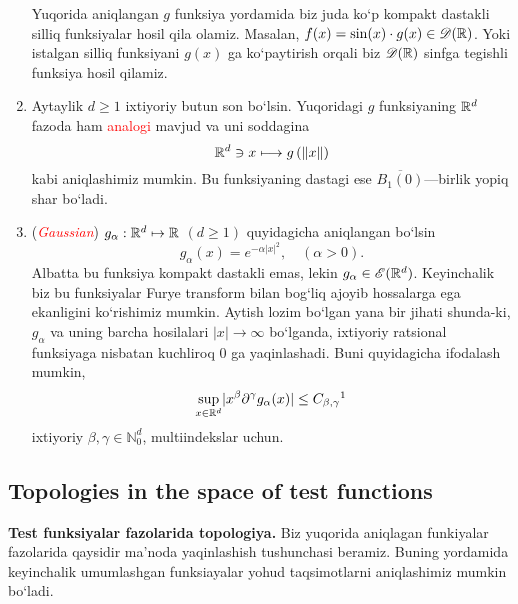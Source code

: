 \begin{example}
\begin{enumerate}
\begin{minipage}{0.9\textwidth}
\begin{minipage}[b]{0.45\textwidth}
\begin{figure}[H]
        \end{figure}
    \end{minipage}
    \end{minipage}
\break
Yuqorida aniqlangan $g$ funksiya yordamida biz juda ko`p kompakt dastakli sil\-liq funksiyalar hosil qila olamiz. Masalan, $f(x)=\sin(x)\cdot g(x)\in\mathscr{D}(\mathbb{R})$. Yoki istalgan silliq funksiyani $g(x)$ ga ko`paytirish orqali biz $\mathscr{D}(\mathbb{R})$ sinfga tegishli funksiya hosil qilamiz.

\item Aytaylik $d\ge 1$ ixtiyoriy butun son bo`lsin. Yuqoridagi $g$ funksiyaning ${\mathbb{R}^{d}}$ fazoda ham \textcolor{red}{analogi} mavjud va uni soddagina 
\begin{equation*}
    {\mathbb{R}^{d}} \ni x\longmapsto g\left(\lVert x\rVert\right)
\end{equation*}
kabi aniqlashimiz mumkin. Bu funksiyaning dastagi ese $\overline{B_1(0)}$---birlik yopiq shar bo`ladi.

\item (\emph{\textcolor{red}{Gaussian}}) $g_\alpha : {\mathbb{R}^{d}} \mapsto \mathbb{R}$ $(d\ge1)$ quyidagicha aniqlangan bo`lsin 
\begin{equation*}
    g_\alpha(x)=e^{-\alpha \lvert x\rvert^2}, \quad (\alpha>0).
\end{equation*}
Albatta bu funksiya kompakt dastakli emas, lekin $g_\alpha \in\mathscr{E}({\mathbb{R}^{d}})$. Keyinchalik biz bu funksiyalar Furye transform bilan bog`liq ajoyib hossalarga ega ekanligini ko`\-ri\-shi\-miz mumkin. Aytish lozim bo`lgan yana bir jihati shunda-ki, $g_\alpha$ va uning barcha hosilalari $\lvert x\rvert \to \infty$  bo`lganda, ixtiyoriy ratsional funksiyaga nisbatan kuchliroq $0$ ga yaqinlashadi. Buni quyidagicha ifodalash mumkin,
\begin{equation*}
    \sup\limits_{x\in\rd} \lvert x^\beta \partial^\gamma g_\alpha(x)\rvert \le C_{\beta,\gamma} \footnotemark
\end{equation*}
ixtiyoriy $\beta, \gamma\in \mathbb{N}_0^d$, multiindekslar uchun. 
\end{enumerate}
\end{example}

\subsection{Topologies in the space of test functions}\textbf{Test funksiyalar fazolarida to\-po\-lo\-giya.}
Biz yuqorida aniqlagan funkiyalar fazolarida qaysidir ma'noda yaqinlashish tushunchasi beramiz. Buning yordamida keyinchalik umumlashgan funksiayalar yohud taqsimotlarni aniqlashimiz mumkin bo`ladi.
